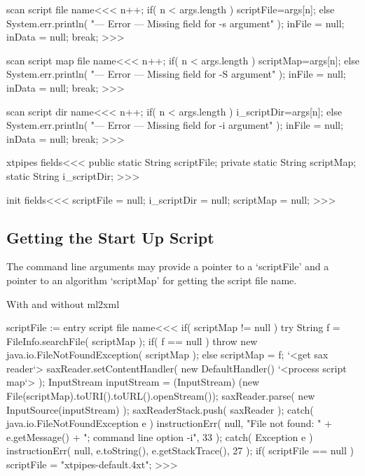 \documentclass{article}
\begin{document}
{\<scan script file name\><<<
n++;
if( n < args.length ){ scriptFile=args[n]; }
else {
  System.err.println(
      "--- Error --- Missing field for -s argument" );
  inFile = null; inData = null;  break;
}
>>>


\<scan script map file name\><<<
n++;
if( n < args.length ){ scriptMap=args[n]; }
else {
  System.err.println(
      "--- Error --- Missing field for -S argument" );
  inFile = null; inData = null;  break;
}
>>>


\<scan script dir name\><<<
n++;
if( n < args.length ){ 
   i_scriptDir=args[n]; 
} else {
  System.err.println(
      "--- Error --- Missing field for -i argument" );
  inFile = null; inData = null; break;
}
>>>




\<xtpipes fields\><<<
public static String scriptFile;
private static String scriptMap;
static String i_scriptDir;
>>>


\<init fields\><<<
scriptFile = null;
i_scriptDir = null;
scriptMap = null;
>>>




\subsection{Getting the Start Up Script}

The command line arguments may provide a pointer to 
a `scriptFile' and a pointer to an algorithm `scriptMap'
for getting the script file name.

With and without ml2xml

\<scriptFile := entry script file name\><<<
if( scriptMap != null ){
   try{
      String f = FileInfo.searchFile( scriptMap );
      if( f == null ){
         throw new java.io.FileNotFoundException( scriptMap );
      } else {
         scriptMap = f;
      }
      `<get sax reader`>        
      saxReader.setContentHandler( new DefaultHandler(){
         `<process script map`>
        } );
      InputStream inputStream =
           (InputStream) (new File(scriptMap).toURI().toURL().openStream());
      saxReader.parse( new InputSource(inputStream) );
      saxReaderStack.push( saxReader );
   } catch( java.io.FileNotFoundException e ){ 
      instructionErr( null, 
                      "File not found: " + e.getMessage()
                      + "; command line option -i",
                      33 );   
   } catch( Exception e ){ 
      instructionErr( null, e.toString(), e.getStackTrace(), 27 ); 
   }
}
if( scriptFile == null ){
    scriptFile = "xtpipes-default.4xt";
}
>>>


}
\end{document}
